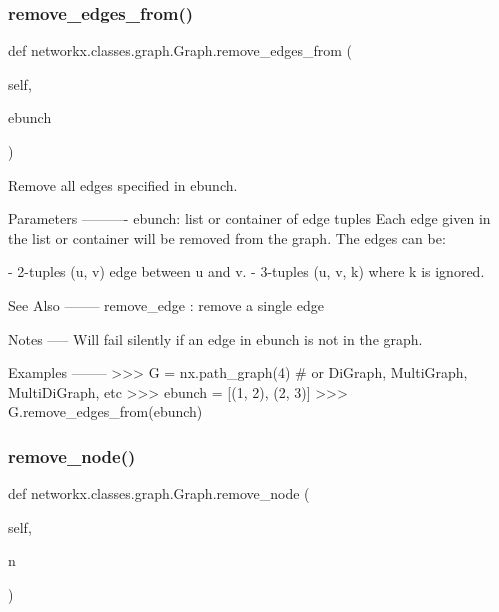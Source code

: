 \subsubsection{\texorpdfstring{remove\+\_\+edges\+\_\+from()}{remove\_edges\_from()}}
{\footnotesize\ttfamily def networkx.\+classes.\+graph.\+Graph.\+remove\+\_\+edges\+\_\+from (\begin{DoxyParamCaption}\item[{}]{self,  }\item[{}]{ebunch }\end{DoxyParamCaption})}

\begin{DoxyVerb}Remove all edges specified in ebunch.

Parameters
----------
ebunch: list or container of edge tuples
    Each edge given in the list or container will be removed
    from the graph. The edges can be:

- 2-tuples (u, v) edge between u and v.
- 3-tuples (u, v, k) where k is ignored.

See Also
--------
remove_edge : remove a single edge

Notes
-----
Will fail silently if an edge in ebunch is not in the graph.

Examples
--------
>>> G = nx.path_graph(4)  # or DiGraph, MultiGraph, MultiDiGraph, etc
>>> ebunch = [(1, 2), (2, 3)]
>>> G.remove_edges_from(ebunch)
\end{DoxyVerb}
 \mbox{\label{classnetworkx_1_1classes_1_1graph_1_1Graph_aaba6b46ffe400f0a1ffa9af875170b2b}} 
\subsubsection{\texorpdfstring{remove\+\_\+node()}{remove\_node()}}
{\footnotesize\ttfamily def networkx.\+classes.\+graph.\+Graph.\+remove\+\_\+node (\begin{DoxyParamCaption}\item[{}]{self,  }\item[{}]{n }\end{DoxyParamCaption})}

